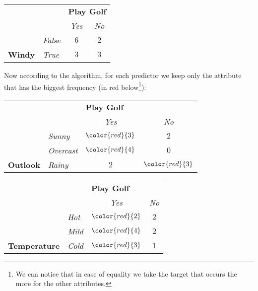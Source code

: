 	\begin{table}[H]
		\centering
		\begin{tabular}{|l|l|c|c|}
		\hline
		\multicolumn{2}{|l|}{} & \multicolumn{2}{l|}{\cellcolor[HTML]{FFCCC9}\textbf{Play Golf}} \\ \cline{3-4} 
		\multicolumn{2}{|l|}{\multirow{-2}{*}{}} & \cellcolor[HTML]{FFCCC9}\textit{Yes} & \cellcolor[HTML]{FFCCC9}\textit{No} \\ \hline
		\cellcolor[HTML]{ECF4FF} & \cellcolor[HTML]{ECF4FF}\textit{False} & $6$ & $2$ \\ \cline{2-4} 
		\multirow{-2}{*}{\cellcolor[HTML]{ECF4FF}\textbf{\phantom{xxx}Windy\phantom{xxx}}} & \cellcolor[HTML]{ECF4FF}\textit{True\phantom{xxxx}} & $3$ & $3$ \\ \hline
		\end{tabular}
	\end{table}
	Now according to the algorithm, for each predictor we keep only the attribute that has the biggest frequency (in red below\footnote{We can notice that in case of equality we take the target that occurs the more for the other attributes.}):
	\begin{table}[H]
		\centering
		\begin{tabular}{|l|l|c|c|}
		\hline
		\multicolumn{2}{|l|}{} & \multicolumn{2}{l|}{\cellcolor[HTML]{FFCCC9}\textbf{Play Golf}} \\ \cline{3-4} 
		\multicolumn{2}{|l|}{\multirow{-2}{*}{}} & \cellcolor[HTML]{FFCCC9}\textit{Yes} & \cellcolor[HTML]{FFCCC9}\textit{No} \\ \hline
		\cellcolor[HTML]{ECF4FF} & \cellcolor[HTML]{ECF4FF}\textit{Sunny} & $\color{red}{3}$ & $2$ \\ \cline{2-4} 
		\cellcolor[HTML]{ECF4FF} & \cellcolor[HTML]{ECF4FF}\textit{Overcast} & $\color{red}{4}$ & $0$ \\ \cline{2-4} 
		\multirow{-3}{*}{\cellcolor[HTML]{ECF4FF}\textbf{\phantom{x} Outlook \phantom{xx}}} & \cellcolor[HTML]{ECF4FF}\textit{Rainy} & $2$ & $\color{red}{3}$ \\ \hline
		\end{tabular}
	\end{table}
	\begin{table}[H]
		\centering
		\begin{tabular}{|l|l|c|c|}
		\hline
		\multicolumn{2}{|l|}{} & \multicolumn{2}{l|}{\cellcolor[HTML]{FFCCC9}\textbf{Play Golf}} \\ \cline{3-4} 
		\multicolumn{2}{|l|}{\multirow{-2}{*}{}} & \cellcolor[HTML]{FFCCC9}\textit{Yes} & \cellcolor[HTML]{FFCCC9}\textit{No} \\ \hline
		\cellcolor[HTML]{ECF4FF} & \cellcolor[HTML]{ECF4FF}\textit{Hot} & $\color{red}{2}$ & $2$ \\ \cline{2-4} 
		\cellcolor[HTML]{ECF4FF} & \cellcolor[HTML]{ECF4FF}\textit{Mild\phantom{xxxx}} & $\color{red}{4}$ & $2$ \\ \cline{2-4} 
		\multirow{-3}{*}{\cellcolor[HTML]{ECF4FF}\textbf{Temperature}} & \cellcolor[HTML]{ECF4FF}\textit{Cold} & $\color{red}{3}$ & $1$ \\ \hline
		\end{tabular}
	\end{table}
	
